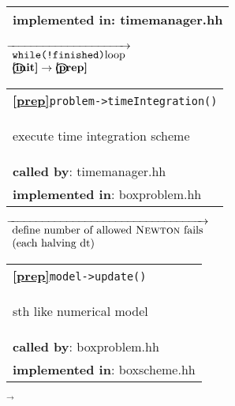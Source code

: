 \begin{landscape}
{\begin{tabular}{|l|}
    \textbf{implemented in}: {timemanager.hh}\\  
    \hline
  \end{tabular} 
{\scriptsize
    $\overrightarrow{ %
      \begin{array}{l} %
	\textnormal{\texttt{while(!finished)}loop}\\
	\textbf{\textbf{\textcircled{\ref{init}}}} \rightarrow \textbf{\textcircled{\ref{prep}} }
      \end{array}
    }$}
  \begin{tabular}{|l|}
    \hline
    \textbf{\textcircled{\ref{prep}}}\verb+problem->timeIntegration()+ \\
    \begin{scriptsize}execute time integration scheme \end{scriptsize}\\
    \textbf{called by}: timemanager.hh\\
    \textbf{implemented in}: boxproblem.hh\\  
\hline
  \end{tabular}    
\nextline
    {\scriptsize$\overrightarrow{
      \begin{array}{l}
	\textnormal{define number of allowed \textsc{Newton} fails} \\
	\textnormal{(each halving dt)}
      \end{array}
    }$}
      \begin{tabular}{|l|}
    \hline
    \textbf{\textcircled{\ref{prep}}}\verb+model->update()+ \\
    \begin{scriptsize}sth like numerical model\end{scriptsize}\\
    \textbf{called by}: boxproblem.hh\\
    \textbf{implemented in}: boxscheme.hh\\  
	\hline
  \end{tabular}
    {\scriptsize$\overrightarrow{ }$}
}
\end{landscape}
